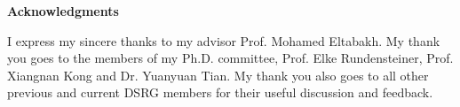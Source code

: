 \newpage
\noindent
\noindent
\begin{center}
{\large \bf Acknowledgments}
\end{center}

\noindent
\noindent

I express my sincere thanks to my advisor Prof. Mohamed Eltabakh. My thank you goes to the members of my Ph.D. committee, Prof. Elke Rundensteiner, Prof. Xiangnan Kong and Dr. Yuanyuan Tian. My thank you also goes to all other previous and current DSRG members for their useful discussion and feedback. 